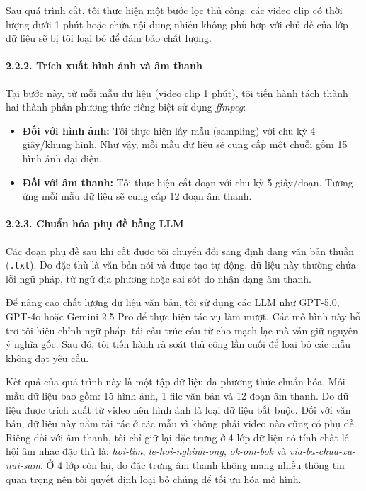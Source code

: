 Sau quá trình cắt, tôi thực hiện một bước lọc thủ công: các video clip có thời lượng dưới 1 phút hoặc chứa nội dung nhiễu không phù hợp với chủ đề của lớp dữ liệu sẽ bị tôi loại bỏ để đảm bảo chất lượng.
\paragraph{2.2.2. Trích xuất hình ảnh và âm thanh}
\indent\indent Tại bước này, từ mỗi mẫu dữ liệu (video clip 1 phút), tôi tiến hành tách thành hai thành phần phương thức riêng biệt sử dụng \textit{ffmpeg}:\vspace{-0.1cm}
\begin{itemize}[label={--}, itemsep=1pt]
    \item \textbf{Đối với hình ảnh:} Tôi thực hiện lấy mẫu (sampling) với chu kỳ 4 giây/khung hình. Như vậy, mỗi mẫu dữ liệu sẽ cung cấp một chuỗi gồm 15 hình ảnh đại diện.
    \item \textbf{Đối với âm thanh:} Tôi thực hiện cắt đoạn với chu kỳ 5 giây/đoạn. Tương ứng mỗi mẫu dữ liệu sẽ cung cấp 12 đoạn âm thanh.
\end{itemize}
\paragraph{2.2.3. Chuẩn hóa phụ đề bằng LLM}
\indent\indent Các đoạn phụ đề sau khi cắt được tôi chuyển đổi sang định dạng văn bản thuần (\texttt{.txt}). Do đặc thù là văn bản nói và được tạo tự động, dữ liệu này thường chứa lỗi ngữ pháp, từ ngữ địa phương hoặc sai sót do nhận dạng âm thanh.\vspace{0.3cm}

Để nâng cao chất lượng dữ liệu văn bản, tôi sử dụng các LLM như GPT-5.0, GPT-4o hoặc Gemini 2.5 Pro để thực hiện tác vụ làm mượt. Các mô hình này hỗ trợ tôi hiệu chỉnh ngữ pháp, tái cấu trúc câu từ cho mạch lạc mà vẫn giữ nguyên ý nghĩa gốc. Sau đó, tôi tiến hành rà soát thủ công lần cuối để loại bỏ các mẫu không đạt yêu cầu.\vspace{0.3cm}

Kết quả của quá trình này là một tập dữ liệu đa phương thức chuẩn hóa. Mỗi mẫu dữ liệu bao gồm: 15 hình ảnh, 1 file văn bản và 12 đoạn âm thanh. Do dữ liệu được trích xuất từ video nên hình ảnh là loại dữ liệu bắt buộc. Đối với văn bản, dữ liệu này nằm rải rác ở các mẫu vì không phải video nào cũng có phụ đề. Riêng đối với âm thanh, tôi chỉ giữ lại đặc trưng ở 4 lớp dữ liệu có tính chất lễ hội âm nhạc đặc thù là: \textit{hoi-lim}, \textit{le-hoi-nghinh-ong}, \textit{ok-om-bok} và \textit{via-ba-chua-xu-nui-sam}. Ở 4 lớp còn lại, do đặc trưng âm thanh không mang nhiều thông tin quan trọng nên tôi quyết định loại bỏ chúng để tối ưu hóa mô hình.
